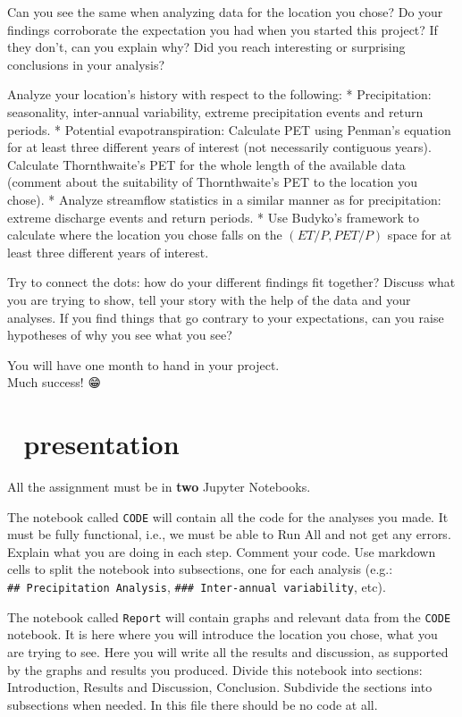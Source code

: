 \documentclass[
  letterpaper,
  DIV=11,
  numbers=noendperiod]{scrreprt}
\begin{document}
Can you see the same when analyzing data for the location you chose? Do
your findings corroborate the expectation you had when you started this
project? If they don't, can you explain why? Did you reach interesting
or surprising conclusions in your analysis?

Analyze your location's history with respect to the following: *
Precipitation: seasonality, inter-annual variability, extreme
precipitation events and return periods. * Potential evapotranspiration:
Calculate PET using Penman's equation for at least three different years
of interest (not necessarily contiguous years). Calculate Thornthwaite's
PET for the whole length of the available data (comment about the
suitability of Thornthwaite's PET to the location you chose). * Analyze
streamflow statistics in a similar manner as for precipitation: extreme
discharge events and return periods. * Use Budyko's framework to
calculate where the location you chose falls on the \((ET/P,PET/P)\)
space for at least three different years of interest.

Try to connect the dots: how do your different findings fit together?
Discuss what you are trying to show, tell your story with the help of
the data and your analyses. If you find things that go contrary to your
expectations, can you raise hypotheses of why you see what you see?

You will have one month to hand in your project.\\
Much success! 😁

\hypertarget{presentation-1}{%
\section{🌅 presentation}\label{presentation-1}}

All the assignment must be in \textbf{two} Jupyter Notebooks.

The notebook called \texttt{CODE} will contain all the code for the
analyses you made. It must be fully functional, i.e., we must be able to
Run All and not get any errors. Explain what you are doing in each step.
Comment your code. Use markdown cells to split the notebook into
subsections, one for each analysis (e.g.:
\texttt{\#\#\ Precipitation\ Analysis},
\texttt{\#\#\#\ Inter-annual\ variability}, etc).

The notebook called \texttt{Report} will contain graphs and relevant
data from the \texttt{CODE} notebook. It is here where you will
introduce the location you chose, what you are trying to see. Here you
will write all the results and discussion, as supported by the graphs
and results you produced. Divide this notebook into sections:
Introduction, Results and Discussion, Conclusion. Subdivide the sections
into subsections when needed. In this file there should be no code at
all.
\end{document}
